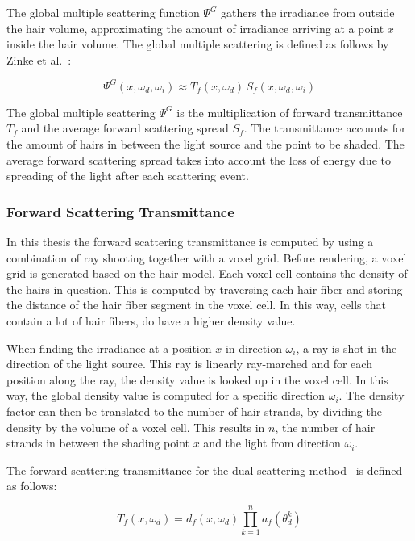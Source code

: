 The global multiple scattering function $\Psi^G$ gathers the irradiance from outside the hair volume, approximating the amount of irradiance arriving at a point $x$ inside the hair volume. The global multiple scattering is defined as follows by Zinke et al.~\cite{zinke}:

\begin{equation}
\Psi^G(x, \omega_d, \omega_i) \approx T_f(x, \omega_d)\,S_f(x, \omega_d, \omega_i)
\end{equation}

The global multiple scattering $\Psi^G$ is the multiplication of forward transmittance $T_f$ and the average forward scattering spread $S_f$. The transmittance accounts for the amount of hairs in between the light source and the point to be shaded. The average forward scattering spread takes into account the loss of energy due to spreading of the light after each scattering event.

\subsubsection{Forward Scattering Transmittance}

In this thesis the forward scattering transmittance is computed by using a combination of ray shooting together with a voxel grid. Before rendering, a voxel grid is generated based on the hair model. Each voxel cell contains the density of the hairs in question. This is computed by traversing each hair fiber and storing the distance of the hair fiber segment in the voxel cell. In this way, cells that contain a lot of hair fibers, do have a higher density value.

When finding the irradiance at a position $x$ in direction $\omega_i$, a ray is shot in the direction of the light source. This ray is linearly ray-marched and for each position along the ray, the density value is looked up in the voxel cell. In this way, the global density value is computed for a specific direction $\omega_i$. The density factor can then be translated to the number of hair strands, by dividing the density by the volume of a voxel cell. This results in $n$, the number of hair strands in between the shading point $x$ and the light from direction $\omega_i$.

The forward scattering transmittance for the dual scattering method~\cite{zinke} is defined as follows:

\begin{equation}
T_f(x, \omega_d) = d_f(x, \omega_d) \prod_{k=1}^{n} a_f(\theta_d^k)
\label{dualscattering_Tf}
\end{equation}

